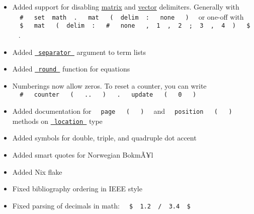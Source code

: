 \begin{itemize}
  \begin{itemize}
  \tightlist
  \item
    Added support for disabling \href{/docs/reference/math/mat/}{matrix}
    and \href{/docs/reference/math/vec/}{vector} delimiters. Generally
    with
    \texttt{\ }{\texttt{\ \#\ }}\texttt{\ }{\texttt{\ set\ }}\texttt{\ math\ }{\texttt{\ .\ }}\texttt{\ }{\texttt{\ mat\ }}\texttt{\ }{\texttt{\ (\ }}\texttt{\ delim\ }{\texttt{\ :\ }}\texttt{\ }{\texttt{\ none\ }}\texttt{\ }{\texttt{\ )\ }}\texttt{\ }
    or one-off with
    \texttt{\ }{\texttt{\ \$\ }}\texttt{\ }{\texttt{\ mat\ }}\texttt{\ }{\texttt{\ (\ }}\texttt{\ delim\ }{\texttt{\ :\ }}\texttt{\ }{\texttt{\ \#\ }}\texttt{\ }{\texttt{\ none\ }}\texttt{\ }{\texttt{\ ,\ }}\texttt{\ 1\ }{\texttt{\ ,\ }}\texttt{\ 2\ }{\texttt{\ ;\ }}\texttt{\ 3\ }{\texttt{\ ,\ }}\texttt{\ 4\ }{\texttt{\ )\ }}\texttt{\ }{\texttt{\ \$\ }}\texttt{\ }
    .
  \item
    Added
    \href{/docs/reference/model/terms/\#parameters-separator}{\texttt{\ separator\ }}
    argument to term lists
  \item
    Added
    \href{/docs/reference/math/lr/\#functions-round}{\texttt{\ round\ }}
    function for equations
  \item
    Numberings now allow zeros. To reset a counter, you can write
    \texttt{\ }{\texttt{\ \#\ }}\texttt{\ }{\texttt{\ counter\ }}\texttt{\ }{\texttt{\ (\ }}\texttt{\ }{\texttt{\ ..\ }}\texttt{\ }{\texttt{\ )\ }}\texttt{\ }{\texttt{\ .\ }}\texttt{\ }{\texttt{\ update\ }}\texttt{\ }{\texttt{\ (\ }}\texttt{\ }{\texttt{\ 0\ }}\texttt{\ }{\texttt{\ )\ }}\texttt{\ }
  \item
    Added documentation for
    \texttt{\ }{\texttt{\ page\ }}\texttt{\ }{\texttt{\ (\ }}\texttt{\ }{\texttt{\ )\ }}\texttt{\ }
    and
    \texttt{\ }{\texttt{\ position\ }}\texttt{\ }{\texttt{\ (\ }}\texttt{\ }{\texttt{\ )\ }}\texttt{\ }
    methods on
    \href{/docs/reference/introspection/location/}{\texttt{\ location\ }}
    type
  \item
    Added symbols for double, triple, and quadruple dot accent
  \item
    Added smart quotes for Norwegian BokmÃ¥l
  \item
    Added Nix flake
  \item
    Fixed bibliography ordering in IEEE style
  \item
    Fixed parsing of decimals in math:
    \texttt{\ }{\texttt{\ \$\ }}\texttt{\ 1.2\ }{\texttt{\ /\ }}\texttt{\ 3.4\ }{\texttt{\ \$\ }}\texttt{\ }

\end{itemize}
\end{itemize}
